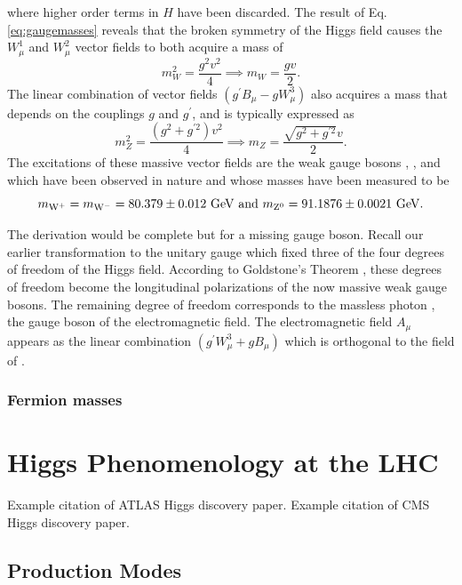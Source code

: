 where higher order terms in $H$ have been discarded. The result of Eq. \ref{eq:gaugemasses} reveals that the broken symmetry of the Higgs field causes the $W_{\mu}^{1}$ and $W_{\mu}^{2}$ vector fields to both acquire a mass of
\begin{equation}
  m_{W}^{2} = \frac{g^{2}v^{2}}{4} \implies m_{W} = \frac{gv}{2}.
\end{equation}
The linear combination of vector fields $(g^{\prime}B_{\mu} - gW_{\mu}^{3})$ also acquires a mass that depends on the couplings $g$ and $g^{\prime}$, and is typically expressed as
\begin{equation}
  m_{Z}^{2} = \frac{(g^{2} + g^{\prime 2}) v^{2}}{4} \implies m_{Z} = \frac{\sqrt{g^{2} + g^{\prime 2}} v}{2}.
\end{equation}
The excitations of these massive vector fields are the weak gauge bosons \bosWp, \bosWm, and \bosZn which have been observed in nature and whose masses have been measured\cite{PDG2018} to be
\begin{equation}
  m_{\bosWp} = m_{\bosWm} = 80.379 \pm 0.012\ \GeV\ \mathrm{and}\ m_{\bosZn} = 91.1876 \pm 0.0021\ \GeV.
\end{equation}

The derivation would be complete but for a missing gauge boson. Recall our earlier transformation to the unitary gauge which fixed three of the four degrees of freedom of the Higgs field. According to Goldstone's Theorem \cite{Goldstone}, these degrees of freedom become the longitudinal polarizations of the now massive weak gauge bosons. The remaining degree of freedom corresponds to the massless photon \bosg, the gauge boson of the electromagnetic field. The electromagnetic field $A_{\mu}$ appears as the linear combination $(g^{\prime}W_{\mu}^{3} + gB_{\mu})$ which is orthogonal to the field of \bosZn.

\subsubsection{Fermion masses}

\section{Higgs Phenomenology at the LHC}

Example citation of ATLAS Higgs discovery paper. \cite{ATLASHiggsDiscovery}
Example citation of CMS Higgs discovery paper. \cite{CMSHiggsDiscovery}

\subsection{Production Modes}

